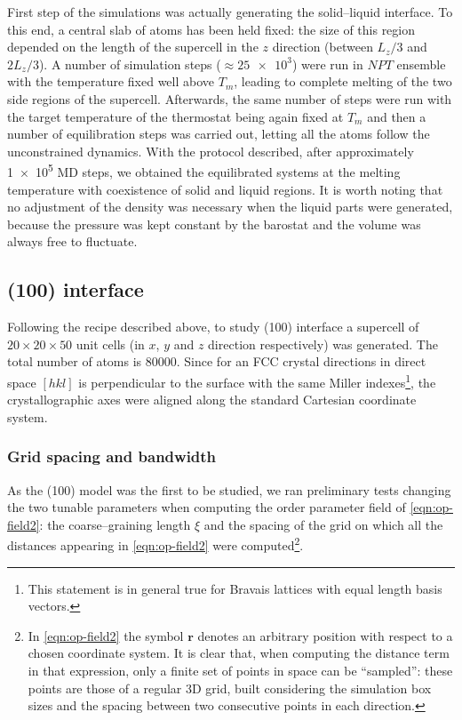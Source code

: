 First step of the simulations was actually generating the solid--liquid interface. To this end, a central slab of atoms has been held fixed: the size of this region depended on the length of the supercell in the $z$ direction (between $L_z/3$ and $2L_z/3$). A number of simulation steps ($\approx \num{25e3}$) were run in $NPT$ ensemble with the temperature fixed well above $T_m$, leading to complete melting of the two side regions of the supercell. Afterwards, the same number of steps were run with the target temperature of the thermostat being again fixed at $T_m$ and then a number of equilibration steps was carried out, letting all the atoms follow the unconstrained dynamics. With the protocol described, after approximately \num{1e5} MD steps, we obtained the equilibrated systems at the melting temperature with coexistence of solid and liquid regions. It is worth noting that no adjustment of the density was necessary when the liquid parts were generated, because the pressure was kept constant by the barostat and the volume was always free to fluctuate.



\subsection{(100) interface}
Following the recipe described above, to study (100) interface a supercell of $20\times 20 \times 50$ unit cells (in $x$, $y$ and $z$ direction respectively) was generated. The total number of atoms is \num{80000}. Since for an FCC crystal directions in direct space $[hkl]$ is perpendicular to the surface with the same Miller indexes\footnote{This statement is in general true for Bravais lattices with equal length basis vectors.}, the crystallographic axes were aligned along the standard Cartesian coordinate system.

\subsubsection{Grid spacing and bandwidth}
As the (100) model was the first to be studied, we ran preliminary tests changing the two tunable parameters when computing the order parameter field of \cref{eqn:op-field2}: the coarse--graining length $\xi$ and the spacing of the grid on which all the distances appearing in \cref{eqn:op-field2} were computed\footnote{In \cref{eqn:op-field2} the symbol $\bm{r}$ denotes an arbitrary position with respect to a chosen coordinate system. It is clear that, when computing the distance term in that expression, only a finite set of points in space can be ``sampled'': these points are those of a regular 3D grid, built considering the simulation box sizes and the spacing between two consecutive points in each direction.}.

